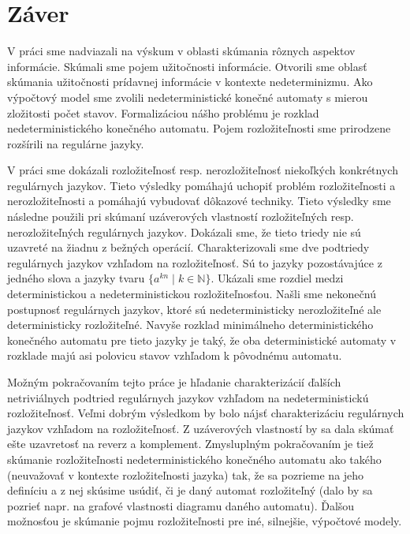 \chapter*{Záver}

V práci sme nadviazali na výskum v oblasti skúmania rôznych aspektov informácie. Skúmali sme pojem užitočnosti informácie. Otvorili sme oblasť skúmania užitočnosti prídavnej informácie v kontexte nedeterminizmu. Ako výpočtový model sme zvolili nedeterministické konečné automaty s mierou zložitosti počet stavov. Formalizáciou nášho problému je rozklad nedeterministického konečného automatu. Pojem rozložiteľnosti sme prirodzene rozšírili na regulárne jazyky.
\par
V práci sme dokázali rozložiteľnosť resp. nerozložiteľnosť niekoľkých konkrétnych regulárnych jazykov. Tieto výsledky pomáhajú uchopiť problém rozložiteľnosti a nerozložiteľnosti a pomáhajú vybudovať dôkazové techniky. Tieto výsledky sme následne použili pri skúmaní uzáverových vlastností rozložiteľných resp. nerozložiteľných regulárnych jazykov. Dokázali sme, že tieto triedy nie sú uzavreté na žiadnu z bežných operácií. Charakterizovali sme dve podtriedy regulárnych jazykov vzhľadom na rozložiteľnosť. Sú to jazyky pozostávajúce z jedného slova a jazyky tvaru $ \lbrace a^{kn} \; | \; k \in \mathbb{N} \rbrace $. Ukázali sme rozdiel medzi deterministickou a nedeterministickou rozložiteľnosťou. Našli sme nekonečnú postupnosť regulárnych jazykov, ktoré sú nedeterministicky nerozložiteľné ale deterministicky rozložiteľné. Navyše rozklad minimálneho deterministického konečného automatu pre tieto jazyky je taký, že oba deterministické automaty v rozklade majú asi polovicu stavov vzhľadom k pôvodnému automatu.
\par
Možným pokračovaním tejto práce je hľadanie charakterizácií ďalších netriviálnych podtried regulárnych jazykov vzhľadom na nedeterministickú rozložiteľnosť. Veľmi dobrým výsledkom by bolo nájsť charakterizáciu regulárnych jazykov vzhľadom na rozložiteľnosť. Z uzáverových vlastností by sa dala skúmať ešte uzavretosť na reverz a komplement. Zmysluplným pokračovaním je tiež skúmanie rozložiteľnosti nedeterministického konečného automatu ako takého (neuvažovať v kontexte rozložiteľnosti jazyka) tak, že sa pozrieme na jeho definíciu a z nej skúsime usúdiť, či je daný automat rozložiteľný (dalo by sa pozrieť napr. na grafové vlastnosti diagramu daného automatu). Ďalšou možnosťou je skúmanie pojmu rozložiteľnosti pre iné, silnejšie, výpočtové modely.